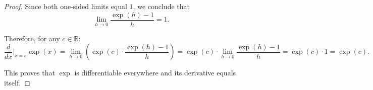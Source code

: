 \begin{proof}
Since both one-sided limits equal $1$, we conclude that
$$\lim_{h \to 0} \frac{\exp(h)-1}{h} = 1.$$

Therefore, for any $c \in \mathbb{R}$:
$$\frac{d}{dx}\biggr|_{x=c} \exp(x) = \lim_{h \to 0} \left( \exp(c) \cdot  \frac{\exp(h)-1}{h} \right) = \exp(c) \cdot \lim_{h \to 0} \frac{\exp(h)-1}{h} = \exp(c) \cdot 1 = \exp(c).$$

This proves that $\exp$ is differentiable everywhere and its derivative equals itself.
\end{proof}
